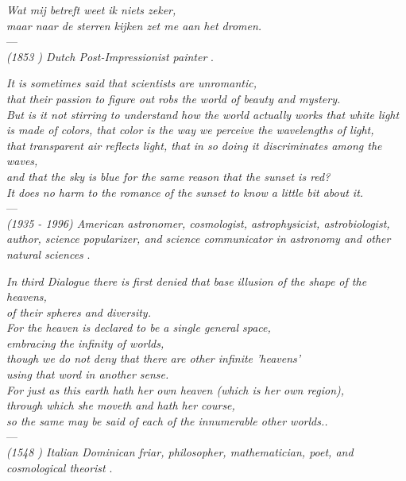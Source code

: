 
\begin{flushright}{\slshape 
    Wat mij betreft weet ik niets zeker,\\
    maar naar de sterren kijken zet me aan het dromen.\\ \medskip}
    ---\color{halfgray}{Vincent Willem van Gogh}\\ \footnotesize\textit{(1853 ) Dutch Post-Impressionist painter }.
\end{flushright}

\begin{flushright}{\slshape 
    It is sometimes said that scientists are unromantic, \\ that their passion to figure out robs the world of beauty and mystery. \\
    But is it not stirring to understand how the world actually works \texttwelveudash  that white light is made of colors,
    that color is the way we perceive the wavelengths of light,\\ that transparent air reflects light,
    that in so doing it discriminates among the waves, \\ and that the sky is blue for the same reason that the sunset is red? \\
    It does no harm to the romance of the sunset to know a little bit about it.\\ \medskip}
    ---\color{halfgray}{Carl Sagan, Pale Blue Dot: A Vision of the Human Future in Space}\\ \footnotesize\textit{(1935 - 1996) American astronomer, cosmologist, astrophysicist, astrobiologist, author, science popularizer, and science communicator in astronomy and other natural sciences }.
\end{flushright}

\begin{flushright}{\slshape 
    In  third Dialogue there is first denied that base illusion of the shape of the heavens,\\  of their spheres and diversity.\\
    For the heaven is declared to be a single general space,\\ embracing the infinity of worlds,\\ 
    though we do not deny that there are other infinite 'heavens'\\ using that word in another sense.\\ 
    For just as this earth hath her own heaven (which is her own region),\\ through which she moveth and hath her course, \\
    so the same may be said of each of the innumerable other worlds..\\ \medskip}
---\color{halfgray}{Giordano Bruno}\\ \footnotesize\textit{(1548 ) Italian Dominican friar, philosopher, mathematician, poet, and cosmological theorist }.
\end{flushright}


